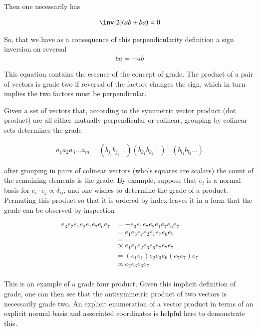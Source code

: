 Then one necessarily has

\begin{align*}
\inv{2}(ab + ba) = 0 
\end{align*}

So, that we have as a consequence of this perpendicularity definition a sign inversion on reversal
\begin{align*}
ba = -ab
\end{align*}

This equation contains the essence of the concept of grade.  The product of a pair of vectors is grade two
if reversal of the factors changes the sign, which in turn implies the two factors must be perpendicular.

Given a set of vectors that, according to the symmetric vector product (dot product) are all either mutually perpendicular or colinear, grouping by colinear sets determines the grade

\begin{align*}
a_1 a_2 a_3 ... a_m = (b_{j_1} b_{j_2} ... ) (b_{k_1} b_{k_2} ... ) ...  (b_{l_1} b_{l_2} ... )
\end{align*}

after grouping in pairs of colinear vectors (who's squares are scalars) the count of the remaining elements is the grade.  By  
example, suppose that ${e_i}$ is a normal basis for  $e_i \cdot e_j \propto \delta_{ij}$, and one wishes to determine the grade
of a product.  Permuting this product so that it is ordered by index leaves it in a form that the grade can be observed by inspection

\begin{align*}
e_3 e_7 e_1 e_2 e_1 e_7 e_6 e_7 
&= - e_3 e_1 e_7 e_2 e_1 e_7 e_6 e_7 \\
&= e_1 e_3 e_7 e_2 e_1 e_7 e_6 e_7 \\
&= ... \\
&\propto e_1 e_1 e_2 e_3 e_6 e_7 e_7 e_7 \\
&= (e_1 e_1) e_2 e_3 e_6 (e_7 e_7) e_7 \\
&\propto e_2 e_3 e_6 e_7 \\
\end{align*}

This is an example of a grade four product.  Given this implicit definition of grade, one can then see that the antisymmetric product of
two vectors is necessarily grade two.  An explicit enumeration of a vector product in terms of an explicit normal basis and associated 
coordinates is helpful here to demonstrate this.

